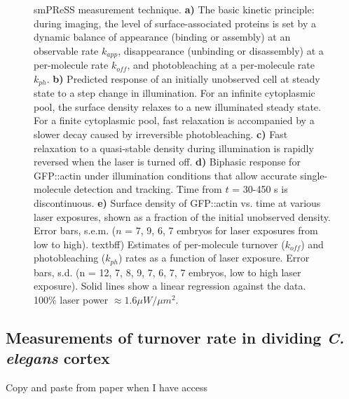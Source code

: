 \begin{figure}[h!]
\caption{smPReSS measurement technique.  \textbf{a)}  The basic kinetic principle: during imaging, the level of surface-associated proteins is set by a dynamic balance of appearance (binding or assembly) at an observable rate $k_{app}$, disappearance (unbinding or disassembly) at a per-molecule rate $k_{off}$, and photobleaching at a per-molecule rate $k_{ph}$.  \textbf{b)} Predicted response of an initially unobserved cell at steady state to a step change in illumination. For an infinite cytoplasmic pool, the surface density relaxes to a new illuminated steady state. For a finite cytoplasmic pool, fast relaxation is accompanied by a slower decay caused by irreversible photobleaching. \textbf{c)} Fast relaxation to a quasi-stable density during illumination is rapidly reversed when the laser is turned off. \textbf{d)}  Biphasic response for GFP::actin under illumination conditions that allow accurate single-molecule detection and tracking. Time from $t$ = 30-450 s is discontinuous. \textbf{e)} Surface density of GFP::actin vs. time at various laser exposures, shown as a fraction of the initial unobserved density. Error bars, s.e.m. ($n$ = 7, 9, 6, 7 embryos for laser exposures from low to high). textbf{f)} Estimates of per-molecule turnover ($k_{off}$) and photobleaching ($k_{ph}$) rates as a function of laser exposure. Error bars, s.d. (n = 12, 7, 8, 9, 7, 6, 7, 7 embryos, low to high laser exposure). Solid lines show a linear regression against the data. 100\% laser power $\approx 1.6 \mu W/\mu m^2$.} 
 
\end{figure}


\subsection{Measurements of turnover rate in dividing \textit{C. elegans} cortex}

Copy and paste from paper when I have access


